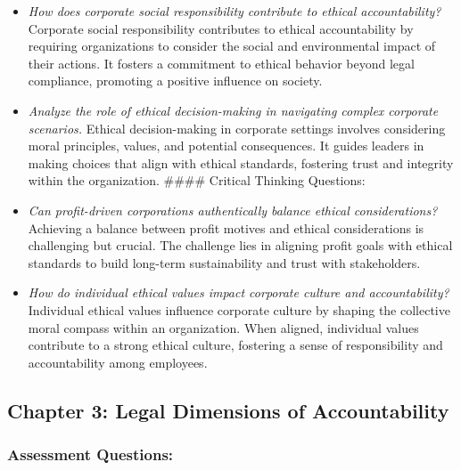 \documentclass[
  letterpaper,
  DIV=11,
  numbers=noendperiod]{scrreprt}
\begin{document}
\begin{itemize}
\item
  \emph{How does corporate social responsibility contribute to ethical
  accountability?} Corporate social responsibility contributes to
  ethical accountability by requiring organizations to consider the
  social and environmental impact of their actions. It fosters a
  commitment to ethical behavior beyond legal compliance, promoting a
  positive influence on society.
\item
  \emph{Analyze the role of ethical decision-making in navigating
  complex corporate scenarios.} Ethical decision-making in corporate
  settings involves considering moral principles, values, and potential
  consequences. It guides leaders in making choices that align with
  ethical standards, fostering trust and integrity within the
  organization. \#\#\#\# Critical Thinking Questions:
\item
  \emph{Can profit-driven corporations authentically balance ethical
  considerations?} Achieving a balance between profit motives and
  ethical considerations is challenging but crucial. The challenge lies
  in aligning profit goals with ethical standards to build long-term
  sustainability and trust with stakeholders.
\item
  \emph{How do individual ethical values impact corporate culture and
  accountability?} Individual ethical values influence corporate culture
  by shaping the collective moral compass within an organization. When
  aligned, individual values contribute to a strong ethical culture,
  fostering a sense of responsibility and accountability among
  employees.
\end{itemize}

\subsection{Chapter 3: Legal Dimensions of
Accountability}\label{chapter-3-legal-dimensions-of-accountability}

\subsubsection{Assessment Questions:}\label{assessment-questions-10}
\end{document}
